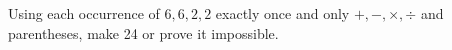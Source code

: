 Using each occurrence of $6,6,2,2$ exactly once and only $+,-,\times,\div$ and parentheses, make 24 or prove it impossible.

